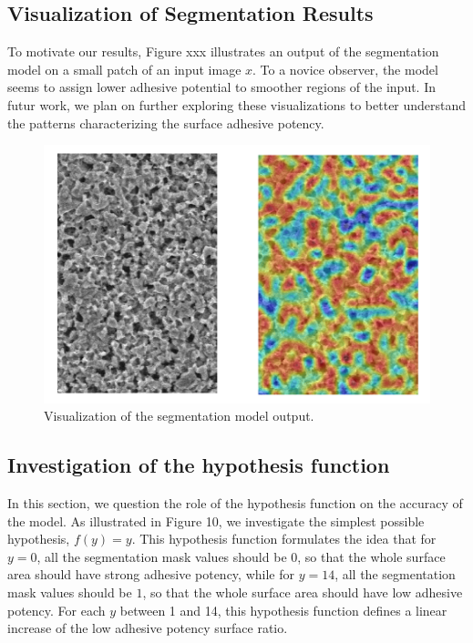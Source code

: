 \documentclass[10pt,twocolumn,letterpaper]{article}
\begin{document}
\subsection{Visualization of Segmentation Results}

To motivate our results, Figure xxx illustrates an output of the segmentation model on a small patch of an input image $x$.
To a novice observer, the model seems to assign lower adhesive potential to smoother regions of the input.
In futur work, we plan on further exploring these visualizations to better understand the 
patterns characterizing the surface adhesive potency.

\begin{figure}[h]
	\centering
	\includegraphics[width=0.9\linewidth]{"./figures/Figure9"}
	\caption{
		Visualization of the segmentation model output.
	}
\end{figure}

\subsection{Investigation of the hypothesis function}

In this section, we question the role of the hypothesis function on the accuracy of the model.
As illustrated in Figure 10, we investigate the simplest possible hypothesis, $f(y)=y$.
This hypothesis function formulates the idea that for $y=0$, 
all the  segmentation mask values should be 0, 
so that the whole surface area should have strong adhesive potency, 
while for $y=14$, all the segmentation mask values should be $1$, so that 
the whole surface area should have low adhesive potency.
For each $y$ between 1 and 14, this hypothesis function defines a linear increase
of the low adhesive potency surface ratio.
\end{document}
